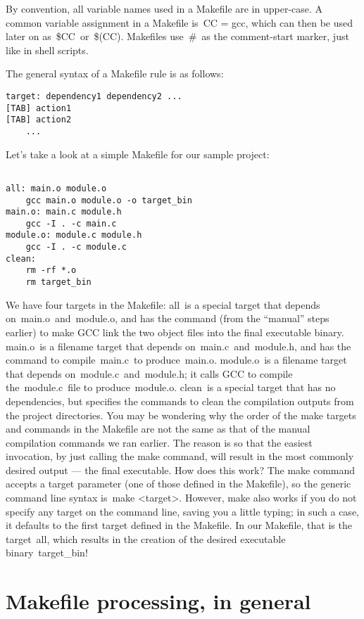 \documentclass[12pt]{article}
\begin{document}
By convention, all variable names used in a Makefile are in upper-case. A common variable assignment in a Makefile is CC = gcc, which can then be used later on as \${CC} or \$(CC). Makefiles use \# as the comment-start marker, just like in shell scripts.

The general syntax of a Makefile rule is as follows:

\begin{verbatim}
target: dependency1 dependency2 ...
[TAB] action1
[TAB] action2
    ...
\end{verbatim}

Let’s take a look at a simple Makefile for our sample project:

\begin{verbatim}

all: main.o module.o
    gcc main.o module.o -o target_bin
main.o: main.c module.h
    gcc -I . -c main.c
module.o: module.c module.h
    gcc -I . -c module.c
clean:
    rm -rf *.o
    rm target_bin
\end{verbatim}

We have four targets in the Makefile:
all is a special target that depends on main.o and module.o, and has the command (from the “manual” steps earlier) to make GCC link the two object files into the final executable binary.
main.o is a filename target that depends on main.c and module.h, and has the command to compile main.c to produce main.o.
module.o is a filename target that depends on module.c and module.h; it calls GCC to compile the module.c file to produce module.o.
clean is a special target that has no dependencies, but specifies the commands to clean the compilation outputs from the project directories.
You may be wondering why the order of the make targets and commands in the Makefile are not the same as that of the manual compilation commands we ran earlier. The reason is so that the easiest invocation, by just calling the make command, will result in the most commonly desired output — the final executable. How does this work?
The make command accepts a target parameter (one of those defined in the Makefile), so the generic command line syntax is make <target>. However, make also works if you do not specify any target on the command line, saving you a little typing; in such a case, it defaults to the first target defined in the Makefile. In our Makefile, that is the target all, which results in the creation of the desired executable binary target\_bin!

\section *{Makefile processing, in general}
\end{document}
